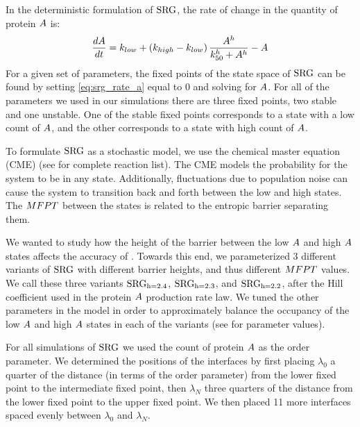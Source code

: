 In the deterministic formulation of $\text{SRG}$, the rate of change in the quantity of protein $A$ is:
\begin{align}
\label{eq:srg_rate_a}
\frac{dA}{dt} = k_{low} + \left(k_{high} - k_{low}\right)\frac{A^h}{k_{50}^h + A^h} - A
\end{align}
For a given set of parameters, the fixed points of the state space of $\text{SRG}$ can be found by setting \eqref{eq:srg_rate_a} equal to 0 and solving for $A$. For all of the parameters we used in our simulations there are three fixed points, two stable and one unstable. One of the stable fixed points corresponds to a state with a low count of $A$, and the other corresponds to a state with high count of $A$. 

To formulate $\text{SRG}$ as a stochastic model, we use the chemical master equation (CME) (see  for complete reaction list). The CME models the probability for the system to be in any state. Additionally, fluctuations due to population noise can cause the system to transition back and forth between the low and high states. The $MFPT$ between the states is related to the entropic barrier separating them.


We wanted to study how the height of the barrier between the low $A$ and high $A$ states affects the accuracy of . Towards this end, we parameterized 3 different variants of $\text{SRG}$ with different barrier heights, and thus different $MFPT$ values. We call these three variants $\text{SRG}_\text{h=2.4}$, $\text{SRG}_\text{h=2.3}$, and $\text{SRG}_\text{h=2.2}$, after the Hill coefficient used in the protein $A$ production rate law. We tuned the other parameters in the model in order to approximately balance the occupancy of the low $A$ and high $A$ states in each of the variants (see  for parameter values).

For all  simulations of $\text{SRG}$ we used the count of protein $A$ as the order parameter. We determined the positions of the interfaces by first placing $\lambda_0$ a quarter of the distance (in terms of the order parameter) from the lower fixed point to the intermediate fixed point, then $\lambda_N$ three quarters of the distance from the lower fixed point to the upper fixed point. We then placed 11 more interfaces spaced evenly between $\lambda_0$ and $\lambda_N$.

